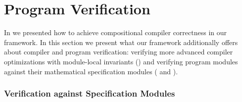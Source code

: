 \chapter{\;\;\;\;Program Verification}
\label{sec:program}

In  we presented how to achieve compositional compiler correctness
in our framework.  In this section we present what our framework additionally offers about compiler and
program verification: verifying more advanced compiler optimizations with module-local
invariants () and verifying program modules against their
mathematical specification modules ( and ).






\subsection{Verification against Specification Modules}
\label{sec:overview-modulelocal:program}

\begin{figure}[t]
\end{figure}

